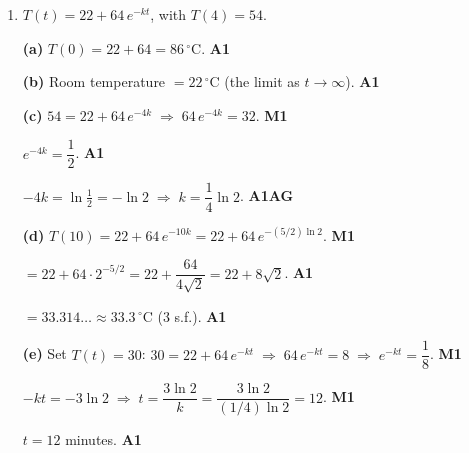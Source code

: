 \documentclass[12pt, twoside]{article}
\begin{document}
\begin{enumerate}[itemsep=0.3cm]
$\dfrac{t}{30} = 3 \;\Rightarrow\; t = 90$ years. \hfill \textbf{A1}

\medskip

\textbf{(c)} $5\,\%$ remaining means $M(t) = 0.05 \times 64 = 3.2$:

$64\,(0.5)^{\,t/30} = 3.2 \;\Rightarrow\; (0.5)^{\,t/30} = 0.05$.
\hfill \textbf{M1}

Take $\ln$:
$\dfrac{t}{30} = \dfrac{\ln 0.05}{\ln 0.5} = 4.3219\ldots$,
\;so\; $t = 129.66\ldots$. \hfill \textbf{M1}

$t \approx 130$ years (nearest year). \hfill \textbf{A1}

\newpage

\item[4.] [Maximum mark: 11]

$T(t) = 22 + 64\, e^{-kt}$, with $T(4) = 54$.

\medskip

\textbf{(a)} $T(0) = 22 + 64 = 86\,^{\circ}$C. \hfill \textbf{A1}

\medskip

\textbf{(b)} Room temperature $= 22\,^{\circ}$C \;(the limit as
$t \to \infty$). \hfill \textbf{A1}

\medskip

\textbf{(c)} $54 = 22 + 64\, e^{-4k}
\;\Rightarrow\; 64\, e^{-4k} = 32$. \hfill \textbf{M1}

$e^{-4k} = \dfrac{1}{2}$. \hfill \textbf{A1}

$-4k = \ln\tfrac{1}{2} = -\ln 2 \;\Rightarrow\; k = \dfrac{1}{4}\ln 2$.
\hfill \textbf{A1\;AG}

\medskip

\textbf{(d)} $T(10) = 22 + 64\, e^{-10 k}
= 22 + 64\, e^{-(5/2)\ln 2}$. \hfill \textbf{M1}

$= 22 + 64 \cdot 2^{-5/2} = 22 + \dfrac{64}{4\sqrt{2}}
= 22 + 8\sqrt{2}$. \hfill \textbf{A1}

$= 33.314\ldots \approx 33.3\,^{\circ}$C (3 s.f.). \hfill \textbf{A1}

\medskip

\textbf{(e)} Set $T(t) = 30$:
$30 = 22 + 64\, e^{-kt} \;\Rightarrow\; 64\, e^{-kt} = 8
\;\Rightarrow\; e^{-kt} = \dfrac{1}{8}$. \hfill \textbf{M1}

$-kt = -3\ln 2 \;\Rightarrow\; t = \dfrac{3\ln 2}{k}
= \dfrac{3\ln 2}{(1/4)\ln 2} = 12$. \hfill \textbf{M1}

$t = 12$ minutes. \hfill \textbf{A1}

\end{enumerate}
\end{document}
